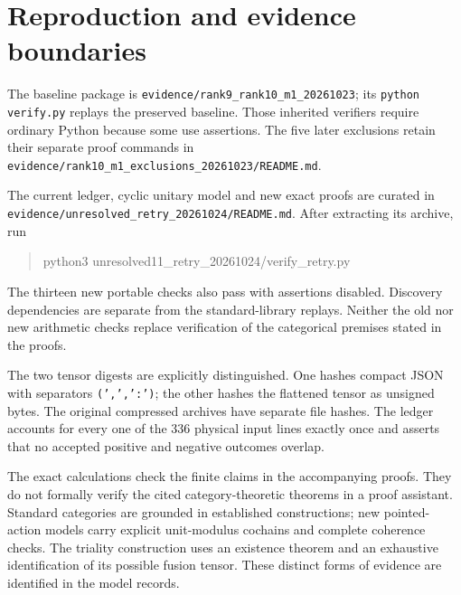 \documentclass[11pt]{article}
\theoremstyle{remark}\newtheorem{remark}[proposition]{Remark}
\begin{document}









\section{Reproduction and evidence boundaries}
The baseline package is \nolinkurl{evidence/rank9_rank10_m1_20261023}; its
\nolinkurl{python verify.py} replays the preserved baseline. Those inherited
verifiers require ordinary Python because some use assertions. The five
later exclusions retain their separate proof commands in
\nolinkurl{evidence/rank10_m1_exclusions_20261023/README.md}.

The current ledger, cyclic unitary model and new exact proofs are curated
in \nolinkurl{evidence/unresolved_retry_20261024/README.md}. After extracting
its archive, run
\begin{quote}\ttfamily
python3 unresolved11\_retry\_20261024/verify\_retry.py
\end{quote}
The thirteen new portable checks also pass with assertions disabled.
Discovery dependencies are separate from the standard-library replays.
Neither the old nor new arithmetic checks replace verification of the
categorical premises stated in the proofs.

The two tensor digests are explicitly distinguished. One hashes compact JSON
with separators \texttt{(',',':')}; the other hashes the flattened tensor as
unsigned bytes. The original compressed archives have separate file hashes.
The ledger accounts for every one of the 336 physical input lines exactly once
and asserts that no accepted positive and negative outcomes overlap.

The exact calculations check the finite claims in the accompanying proofs.
They do not formally verify the cited category-theoretic theorems in a proof
assistant. Standard categories are grounded in established constructions;
new pointed-action models carry explicit unit-modulus cochains and complete
coherence checks. The triality construction uses an existence theorem and
an exhaustive identification of its possible fusion tensor. These distinct
forms of evidence are identified in the model records.
\end{document}
